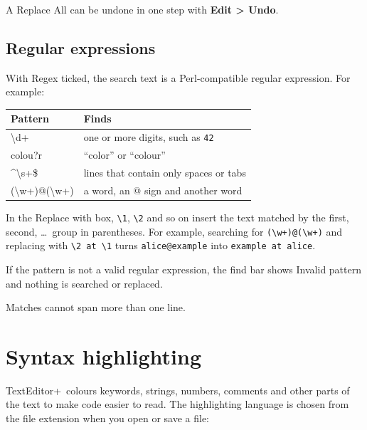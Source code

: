 \documentclass[11pt,a4paper]{article}
\newcommand{\appname}{TextEditor+}
\newcommand{\menu}[1]{\textsf{\textbf{#1}}}
\newcommand{\ui}[1]{\textsf{#1}}
\begin{document}
A \ui{Replace All} can be undone in one step with \menu{Edit > Undo}.

\subsection{Regular expressions}\label{sec:regex}

With \ui{Regex} ticked, the search text is a Perl-compatible regular
expression. For example:

\begin{center}
\begin{tabularx}{\linewidth}{>{\ttfamily}l X}
  \toprule
  \textbf{\textsf{Pattern}} & \textbf{Finds} \\
  \midrule
  \textbackslash d+           & one or more digits, such as \texttt{42} \\
  colou?r                     & ``color'' or ``colour'' \\
  \textasciicircum\textbackslash s+\$ & lines that contain only spaces or tabs \\
  (\textbackslash w+)@(\textbackslash w+) & a word, an @ sign and another word \\
  \bottomrule
\end{tabularx}
\end{center}

In the \ui{Replace with} box, \texttt{\textbackslash 1}, \texttt{\textbackslash 2}
and so on insert the text matched by the first, second, \ldots\ group in
parentheses. For example, searching for
\texttt{(\textbackslash w+)@(\textbackslash w+)} and replacing with
\texttt{\textbackslash 2 at \textbackslash 1} turns \texttt{alice@example} into
\texttt{example at alice}.

If the pattern is not a valid regular expression, the find bar shows
\ui{Invalid pattern} and nothing is searched or replaced.

\begin{note}
Matches cannot span more than one line.
\end{note}

\section{Syntax highlighting}\label{sec:languages}

\appname\ colours keywords, strings, numbers, comments and other parts of the
text to make code easier to read. The highlighting language is chosen from the
file extension when you open or save a file:
\end{document}
